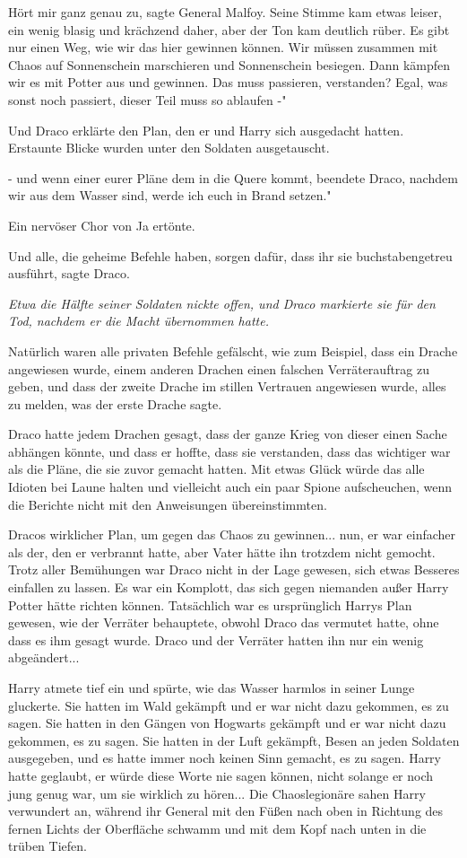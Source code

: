 \glqq Hört mir ganz genau zu\grqq{}, sagte General Malfoy. Seine Stimme kam
etwas leiser, ein wenig blasig und krächzend daher, aber der Ton kam deutlich
rüber. \glqq Es gibt nur einen Weg, wie wir das hier gewinnen können. Wir müssen
zusammen mit Chaos auf Sonnenschein marschieren und Sonnenschein besiegen. Dann
kämpfen wir es mit Potter aus und gewinnen. Das muss passieren, verstanden?
Egal, was sonst noch passiert, dieser Teil muss so ablaufen -"

Und Draco erklärte den Plan, den er und Harry sich ausgedacht hatten. Erstaunte
Blicke wurden unter den Soldaten ausgetauscht.

\glqq - und wenn einer eurer Pläne dem in die Quere kommt\grqq{}, beendete
Draco, \glqq nachdem wir aus dem Wasser sind, werde ich euch in Brand setzen."

Ein nervöser Chor von \glqq Ja\grqq{} ertönte.

\glqq Und alle, die geheime Befehle haben, sorgen dafür, dass ihr sie
buchstabengetreu ausführt\grqq{}, sagte Draco.

\emph{Etwa die Hälfte seiner Soldaten nickte offen, und Draco markierte sie für den
Tod, nachdem er die Macht übernommen hatte.}

Natürlich waren alle privaten Befehle gefälscht, wie zum Beispiel, dass ein
Drache angewiesen wurde, einem anderen Drachen einen falschen Verräterauftrag zu
geben, und dass der zweite Drache im stillen Vertrauen angewiesen wurde, alles
zu melden, was der erste Drache sagte.

Draco hatte jedem Drachen gesagt, dass der ganze Krieg von dieser einen Sache
abhängen könnte, und dass er hoffte, dass sie verstanden, dass das wichtiger war
als die Pläne, die sie zuvor gemacht hatten. Mit etwas Glück würde das alle
Idioten bei Laune halten und vielleicht auch ein paar Spione aufscheuchen, wenn
die Berichte nicht mit den Anweisungen übereinstimmten.

Dracos wirklicher Plan, um gegen das Chaos zu gewinnen... nun, er war einfacher
als der, den er verbrannt hatte, aber Vater hätte ihn trotzdem nicht gemocht.
Trotz aller Bemühungen war Draco nicht in der Lage gewesen, sich etwas Besseres
einfallen zu lassen. Es war ein Komplott, das sich gegen niemanden außer Harry
Potter hätte richten können. Tatsächlich war es ursprünglich Harrys Plan
gewesen, wie der Verräter behauptete, obwohl Draco das vermutet hatte, ohne dass
es ihm gesagt wurde. Draco und der Verräter hatten ihn nur ein wenig
abgeändert...

Harry atmete tief ein und spürte, wie das Wasser harmlos in seiner Lunge
gluckerte. Sie hatten im Wald gekämpft und er war nicht dazu gekommen, es zu
sagen. Sie hatten in den Gängen von Hogwarts gekämpft und er war nicht dazu
gekommen, es zu sagen. Sie hatten in der Luft gekämpft, Besen an jeden Soldaten
ausgegeben, und es hatte immer noch keinen Sinn gemacht, es zu sagen. Harry
hatte geglaubt, er würde diese Worte nie sagen können, nicht solange er noch
jung genug war, um sie wirklich zu hören... Die Chaoslegionäre sahen Harry
verwundert an, während ihr General mit den Füßen nach oben in Richtung des
fernen Lichts der Oberfläche schwamm und mit dem Kopf nach unten in die trüben
Tiefen.

